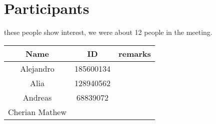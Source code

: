 \documentclass[]{article}
\begin{document}
\section{Participants}\label{participants}

these people show interest, we were about 12 people in the meeting.

\begin{longtable}[c]{@{}ccc@{}}
\toprule
\begin{minipage}[b]{0.24\columnwidth}\centering\strut
Name
\strut\end{minipage} &
\begin{minipage}[b]{0.13\columnwidth}\centering\strut
ID
\strut\end{minipage} &
\begin{minipage}[b]{0.13\columnwidth}\centering\strut
remarks
\strut\end{minipage}\tabularnewline
\midrule
\endhead
\begin{minipage}[t]{0.24\columnwidth}\centering\strut
Alejandro
\strut\end{minipage} &
\begin{minipage}[t]{0.13\columnwidth}\centering\strut
185600134
\strut\end{minipage} &
\begin{minipage}[t]{0.13\columnwidth}\centering\strut
\strut\end{minipage}\tabularnewline
\begin{minipage}[t]{0.24\columnwidth}\centering\strut
Alia
\strut\end{minipage} &
\begin{minipage}[t]{0.13\columnwidth}\centering\strut
128940562
\strut\end{minipage} &
\begin{minipage}[t]{0.13\columnwidth}\centering\strut
\strut\end{minipage}\tabularnewline
\begin{minipage}[t]{0.24\columnwidth}\centering\strut
Andreas
\strut\end{minipage} &
\begin{minipage}[t]{0.13\columnwidth}\centering\strut
68839072
\strut\end{minipage} &
\begin{minipage}[t]{0.13\columnwidth}\centering\strut
\strut\end{minipage}\tabularnewline
\begin{minipage}[t]{0.24\columnwidth}\centering\strut
Cherian Mathew
\strut\end{minipage} &

\end{longtable}
\end{document}
